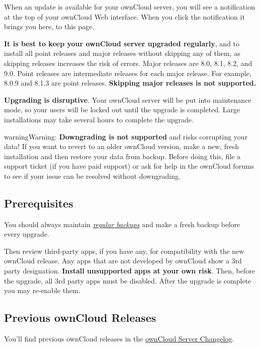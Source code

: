 \documentclass[letterpaper,10pt,english]{sphinxmanual}
\begin{document}
When an update is available for your ownCloud server, you will see a
notification at the top of your ownCloud Web interface. When you click the
notification it brings you here, to this page.

\textbf{It is best to keep your ownCloud server upgraded regularly}, and to install
all point releases and major releases without skipping any of them, as skipping
releases increases the risk of errors. Major releases are 8.0, 8.1, 8.2, and
9.0. Point releases are intermediate releases for each major release. For
example, 8.0.9 and 8.1.3 are point releases. \textbf{Skipping major releases is not
supported.}

\textbf{Upgrading is disruptive}. Your ownCloud server will be put into maintenance
mode, so your users will be locked out until the upgrade is completed. Large
installations may take several hours to complete the upgrade.

\begin{notice}{warning}{Warning:}
\textbf{Downgrading is not supported} and risks corrupting your data! If
you want to revert to an older ownCloud version, make a new, fresh
installation and then restore your data from backup. Before doing this,
file a support ticket (if you have paid support) or ask for help in the
ownCloud forums to see if your issue can be resolved without downgrading.
\end{notice}


\subsection{Prerequisites}
\label{maintenance/upgrade:prerequisites}
You should always maintain {\hyperref[maintenance/backup::doc]{\emph{regular backups}}} and make a fresh
backup before every upgrade.

Then review third-party apps, if you have any, for compatibility with the new
ownCloud release. Any apps that are not developed by ownCloud show a 3rd party
designation. \textbf{Install unsupported apps at your own risk}. Then, before the
upgrade, all 3rd party apps must be disabled. After the upgrade is complete you
may re-enable them.


\subsection{Previous ownCloud Releases}
\label{maintenance/upgrade:previous-owncloud-releases}\label{maintenance/upgrade:owncloud-org-install}
You'll find previous ownCloud releases in the \href{https://owncloud.org/changelog/}{ownCloud Server Changelog}.
\end{document}
